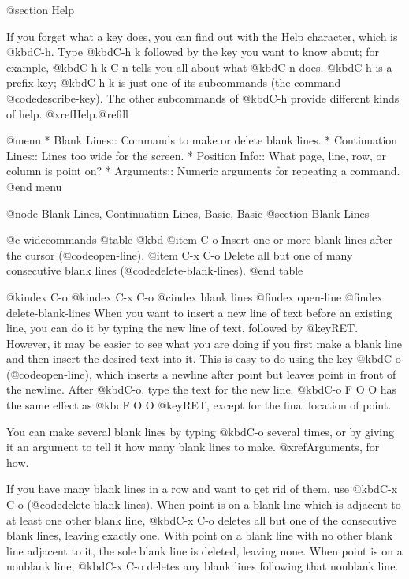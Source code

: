 {{@section Help

  If you forget what a key does, you can find out with the Help character,
which is @kbd{C-h}.  Type @kbd{C-h k} followed by the key you want to know
about; for example, @kbd{C-h k C-n} tells you all about what @kbd{C-n}
does.  @kbd{C-h} is a prefix key; @kbd{C-h k} is just one of its
subcommands (the command @code{describe-key}).  The other subcommands of
@kbd{C-h} provide different kinds of help.  @xref{Help}.@refill

@menu
* Blank Lines::        Commands to make or delete blank lines.
* Continuation Lines:: Lines too wide for the screen.
* Position Info::      What page, line, row, or column is point on?
* Arguments::	       Numeric arguments for repeating a command.
@end menu

@node Blank Lines, Continuation Lines, Basic, Basic
@section Blank Lines

@c widecommands
@table @kbd
@item C-o
Insert one or more blank lines after the cursor (@code{open-line}).
@item C-x C-o
Delete all but one of many consecutive blank lines
(@code{delete-blank-lines}).
@end table

@kindex C-o
@kindex C-x C-o
@cindex blank lines
@findex open-line
@findex delete-blank-lines
  When you want to insert a new line of text before an existing line, you
can do it by typing the new line of text, followed by @key{RET}.  However,
it may be easier to see what you are doing if you first make a blank line
and then insert the desired text into it.  This is easy to do using the key
@kbd{C-o} (@code{open-line}), which inserts a newline after point but leaves
point in front of the newline.  After @kbd{C-o}, type the text for the new
line.  @kbd{C-o F O O} has the same effect as @kbd{F O O @key{RET}}, except for
the final location of point.

  You can make several blank lines by typing @kbd{C-o} several times, or by
giving it an argument to tell it how many blank lines to make.
@xref{Arguments}, for how.

  If you have many blank lines in a row and want to get rid of them, use
@kbd{C-x C-o} (@code{delete-blank-lines}).  When point is on a blank line which
is adjacent to at least one other blank line, @kbd{C-x C-o} deletes all but
one of the consecutive blank lines, leaving exactly one.  With point on a
blank line with no other blank line adjacent to it, the sole blank line is
deleted, leaving none.  When point is on a nonblank line, @kbd{C-x C-o}
deletes any blank lines following that nonblank line.

}}
